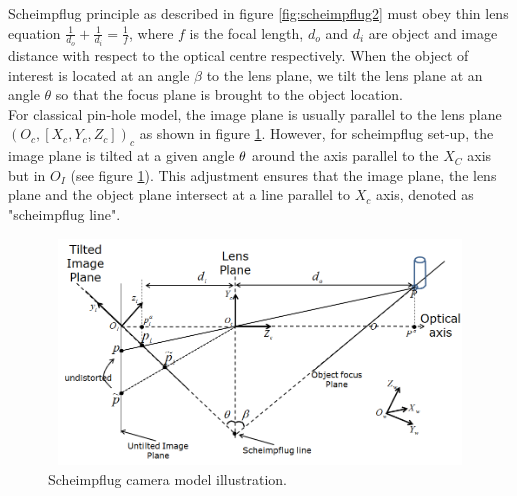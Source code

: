 \documentclass[12pt]{article}
\begin{document}





Scheimpflug principle as described in figure  \ref{fig:scheimpflug2} must obey thin lens equation $\frac{1}{d_{o}}+\frac{1}{d_{i}}=\frac{1}{f}$, where $f$ is the focal length, $d_{o}$ and $d_{i}$ are object and image distance with respect to the optical centre respectively. When the object of interest is located at an angle $\beta$ to the lens plane, we tilt the lens plane at an angle $\theta$ so that the focus plane is brought to the object location. \\


For classical pin-hole model, the image plane is usually parallel to the lens plane $(O_c,[X_c,Y_c,Z_c])_c$ as shown in figure \ref{fig:scheim3}. However, for scheimpflug set-up, the image plane is tilted at a given angle ${\bf{\theta}}$ around the axis parallel to the $X_C$ axis but in  $O_I$  (see figure \ref{fig:scheim3}). This adjustment  ensures that the image plane, the lens plane and the object plane intersect at a line parallel to $X_c$ axis, denoted as  "scheimpflug line". 




\begin{figure}[htb]
	\centering
	\includegraphics[height=6cm, width=12cm]{figures/scheimimg1.png}
	\caption {Scheimpflug camera model illustration.}

	\label{fig:scheim3}
\end{figure}
\end{document}
